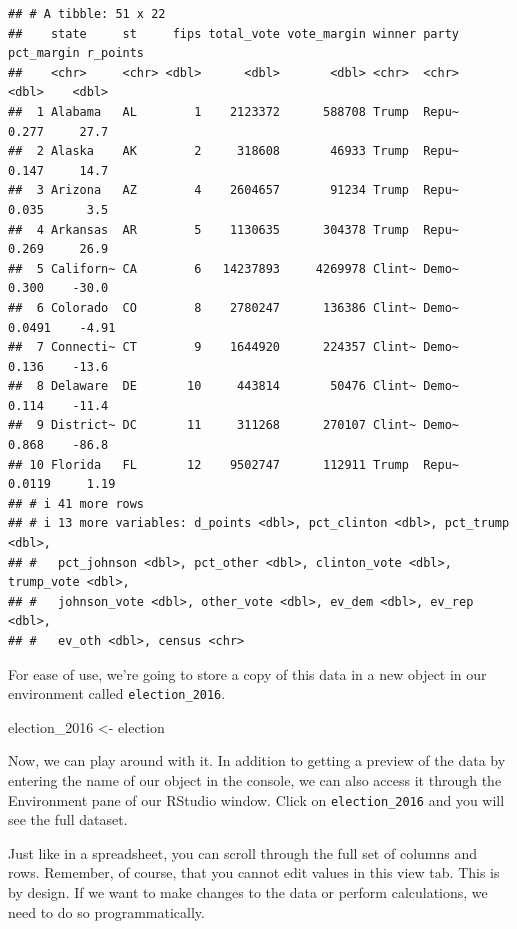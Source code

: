 \documentclass[
]{book}
\newenvironment{Shaded}{\begin{snugshade}}{\end{snugshade}}
\newcommand{\NormalTok}[1]{#1}
\newcommand{\OtherTok}[1]{\textcolor[rgb]{0.56,0.35,0.01}{#1}}
\begin{document}
\begin{verbatim}
## # A tibble: 51 x 22
##    state     st     fips total_vote vote_margin winner party pct_margin r_points
##    <chr>     <chr> <dbl>      <dbl>       <dbl> <chr>  <chr>      <dbl>    <dbl>
##  1 Alabama   AL        1    2123372      588708 Trump  Repu~     0.277     27.7 
##  2 Alaska    AK        2     318608       46933 Trump  Repu~     0.147     14.7 
##  3 Arizona   AZ        4    2604657       91234 Trump  Repu~     0.035      3.5 
##  4 Arkansas  AR        5    1130635      304378 Trump  Repu~     0.269     26.9 
##  5 Californ~ CA        6   14237893     4269978 Clint~ Demo~     0.300    -30.0 
##  6 Colorado  CO        8    2780247      136386 Clint~ Demo~     0.0491    -4.91
##  7 Connecti~ CT        9    1644920      224357 Clint~ Demo~     0.136    -13.6 
##  8 Delaware  DE       10     443814       50476 Clint~ Demo~     0.114    -11.4 
##  9 District~ DC       11     311268      270107 Clint~ Demo~     0.868    -86.8 
## 10 Florida   FL       12    9502747      112911 Trump  Repu~     0.0119     1.19
## # i 41 more rows
## # i 13 more variables: d_points <dbl>, pct_clinton <dbl>, pct_trump <dbl>,
## #   pct_johnson <dbl>, pct_other <dbl>, clinton_vote <dbl>, trump_vote <dbl>,
## #   johnson_vote <dbl>, other_vote <dbl>, ev_dem <dbl>, ev_rep <dbl>,
## #   ev_oth <dbl>, census <chr>
\end{verbatim}

For ease of use, we're going to store a copy of this data in a new object in our environment called \texttt{election\_2016}.

\begin{Shaded}
\begin{Highlighting}[]
\NormalTok{election\_2016 }\OtherTok{\textless{}{-}}\NormalTok{ election}
\end{Highlighting}
\end{Shaded}

Now, we can play around with it. In addition to getting a preview of the data by entering the name of our object in the console, we can also access it through the Environment pane of our RStudio window. Click on \texttt{election\_2016} and you will see the full dataset.

Just like in a spreadsheet, you can scroll through the full set of columns and rows. Remember, of course, that you cannot edit values in this view tab. This is by design. If we want to make changes to the data or perform calculations, we need to do so programmatically.
\end{document}
